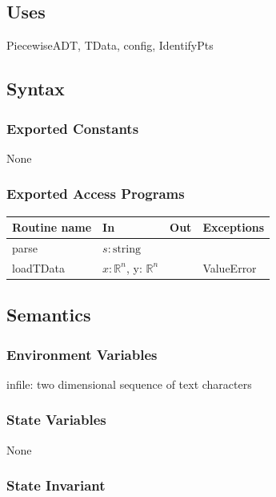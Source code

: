 \documentclass[12pt, titlepage]{article}
\begin{document}
\subsection {Uses}

PiecewiseADT, TData, config, IdentifyPts

\subsection {Syntax}

\subsubsection {Exported Constants}

None

\subsubsection*{Exported Access Programs}

\begin{tabular}{| l | l | l | l |}
\hline
\textbf{Routine name} & \textbf{In} & \textbf{Out} & \textbf{Exceptions}\\
\hline
parse & $s: \mbox{string}$ & ~ & ~\\
loadTData & $x: \mathbb{R}^n$, y: $\mathbb{R}^n$ & ~ & ValueError\\ 
\hline
\end{tabular}

\subsection {Semantics}

\subsubsection {Environment Variables}

infile: two dimensional sequence of text characters

\subsubsection{State Variables}

None

\subsubsection{State Invariant}
\end{document}
